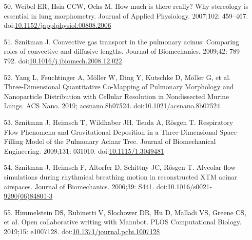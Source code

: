 \documentclass[
  american,
]{article}
\newenvironment{cslreferences}%
  {}%
  {\par}
\begin{document}
\begin{cslreferences}
\leavevmode\hypertarget{ref-1CLJ32t5m}{}%
50. Weibel ER, Hsia CCW, Ochs M. How much is there really? Why stereology is essential in lung morphometry. Journal of Applied Physiology. 2007;102: 459--467. doi:\href{https://doi.org/10.1152/japplphysiol.00808.2006}{10.1152/japplphysiol.00808.2006}

\leavevmode\hypertarget{ref-RJ9GQcwl}{}%
51. Sznitman J. Convective gas transport in the pulmonary acinus: Comparing roles of convective and diffusive lengths. Journal of Biomechanics. 2009;42: 789--792. doi:\href{https://doi.org/10.1016/j.jbiomech.2008.12.022}{10.1016/j.jbiomech.2008.12.022}

\leavevmode\hypertarget{ref-19jBv0ima}{}%
52. Yang L, Feuchtinger A, Möller W, Ding Y, Kutschke D, Möller G, et al. Three-Dimensional Quantitative Co-Mapping of Pulmonary Morphology and Nanoparticle Distribution with Cellular Resolution in Nondissected Murine Lungs. ACS Nano. 2019; acsnano.8b07524. doi:\href{https://doi.org/10.1021/acsnano.8b07524}{10.1021/acsnano.8b07524}

\leavevmode\hypertarget{ref-afF83siN}{}%
53. Sznitman J, Heimsch T, Wildhaber JH, Tsuda A, Rösgen T. Respiratory Flow Phenomena and Gravitational Deposition in a Three-Dimensional Space-Filling Model of the Pulmonary Acinar Tree. Journal of Biomechanical Engineering. 2009;131: 031010. doi:\href{https://doi.org/10.1115/1.3049481}{10.1115/1.3049481}

\leavevmode\hypertarget{ref-k5fqLjiy}{}%
54. Sznitman J, Heimsch F, Altorfer D, Schittny JC, Rösgen T. Alveolar flow simulations during rhythmical breathing motion in reconstructed XTM acinar airspaces. Journal of Biomechanics. 2006;39: S441. doi:\href{https://doi.org/10.1016/s0021-9290(06)84801-3}{10.1016/s0021-9290(06)84801-3}

\leavevmode\hypertarget{ref-YuJbg3zO}{}%
55. Himmelstein DS, Rubinetti V, Slochower DR, Hu D, Malladi VS, Greene CS, et al. Open collaborative writing with Manubot. PLOS Computational Biology. 2019;15: e1007128. doi:\href{https://doi.org/10.1371/journal.pcbi.1007128}{10.1371/journal.pcbi.1007128}
\end{cslreferences}
\end{document}
